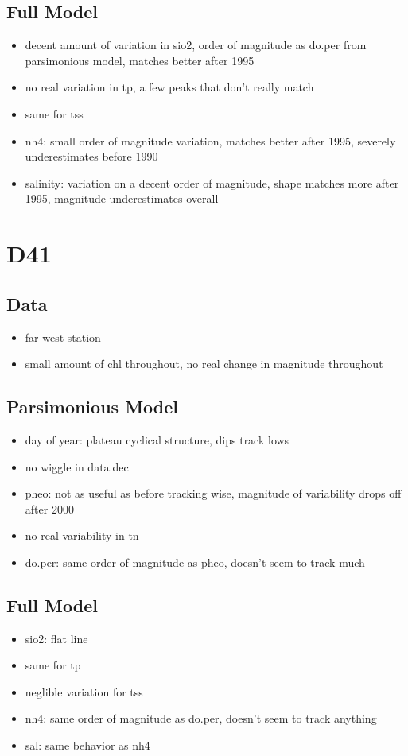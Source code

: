 \documentclass[12pt]{amsart}
\begin{document}
\subsection{Full Model}
\begin{itemize}
\item decent amount of variation in sio2, order of magnitude as do.per from parsimonious model, matches better after 1995
\item no real variation in tp, a few peaks that don't really match
\item same for tss
\item nh4: small order of magnitude variation, matches better after 1995, severely underestimates before 1990
\item salinity: variation on a decent order of magnitude, shape matches more after 1995, magnitude underestimates overall
\end{itemize}

\section{D41}
\subsection{Data}
\begin{itemize}
\item far west station
\item small amount of chl throughout, no real change in magnitude throughout

\end{itemize}
\subsection{Parsimonious Model}
\begin{itemize}
\item day of year: plateau cyclical structure, dips track lows
\item no wiggle in data.dec
\item pheo: not as useful as before tracking wise, magnitude of variability drops off after 2000
\item no real variability in tn
\item do.per: same order of magnitude as pheo, doesn't seem to track much
\end{itemize}
\subsection{Full Model}
\begin{itemize}
\item sio2: flat line
\item same for tp
\item neglible variation for tss
\item nh4: same order of magnitude as do.per, doesn't seem to track anything
\item sal: same behavior as nh4
\end{itemize}
\end{document}
